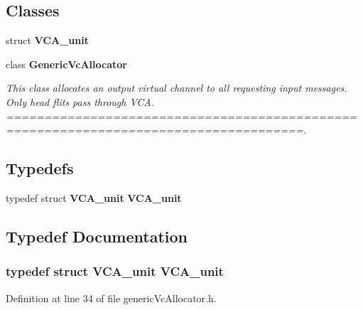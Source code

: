 \subsection*{Classes}
\begin{CompactItemize}
\item 
struct {\bf VCA\_\-unit}
\item 
class {\bf GenericVcAllocator}
\begin{CompactList}\small\item\em This class allocates an output virtual channel to all requesting input messages. Only head flits pass through VCA. =====================================================================================. \item\end{CompactList}\end{CompactItemize}
\subsection*{Typedefs}
\begin{CompactItemize}
\item 
typedef struct {\bf VCA\_\-unit} {\bf VCA\_\-unit}
\end{CompactItemize}


\subsection{Typedef Documentation}
\subsubsection[{VCA\_\-unit}]{\setlength{\rightskip}{0pt plus 5cm}typedef struct {\bf VCA\_\-unit} {\bf VCA\_\-unit}}\label{genericVcAllocator_8h_7b7b7aa167e6c05a95a72e97478f1275}




Definition at line 34 of file genericVcAllocator.h.